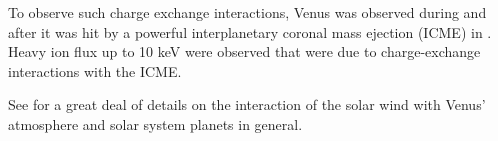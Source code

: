    To observe such charge exchange interactions, Venus was observed during and after it was hit by a powerful interplanetary coronal mass ejection (ICME) in \cite{Xu2019ObservationsEjection}. Heavy ion flux up to 10 keV were observed that were due to charge-exchange interactions with the ICME.

    See \autocite{BhardwajX-raysObjects, Futaana2017SolarAtmosphere} for a great deal of details on the interaction of the solar wind with Venus' atmosphere and solar system planets in general.